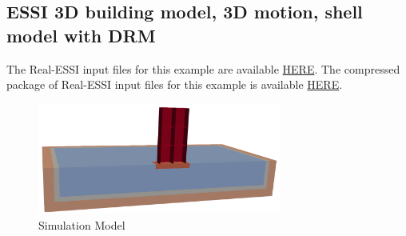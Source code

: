 






\clearpage
\newpage
\subsection{ESSI 3D building model, 3D motion, shell model with DRM}
\label{Earthquake_Soil-Structure_Interaction_3D_Model_with_DRM6}

The Real-ESSI input files for this example are available 
\href{http://sokocalo.engr.ucdavis.edu/~jeremic/lecture_notes_online_material/_Chapter_Short_Course_Examples/Day2/Apply_3D_Motions_from_SW4/Shell_Structure_Soil_Interaction_3D_DRM}{HERE}. 
The compressed package of Real-ESSI input files for this example is available 
\href{http://sokocalo.engr.ucdavis.edu/~jeremic/lecture_notes_online_material/_Chapter_Short_Course_Examples/Day2/Apply_3D_Motions_from_SW4/Shell_Structure_Soil_Interaction_3D_DRM/_all_files_packaged_for_Shell_Structure_Soil_Interaction_3D_DRM.tar.gz}{HERE}. 


\begin{figure}[H]
  \centering
  \includegraphics[width = 8cm]{./Figure-files/Day2/Apply_3D_Motions_from_SW4/Shell_Structure_Soil_Interaction_3D_DRM/overview.png}
  \caption{Simulation Model}
  \label{fig_decon_1D_motion_3D_model_shell2}
\end{figure}


